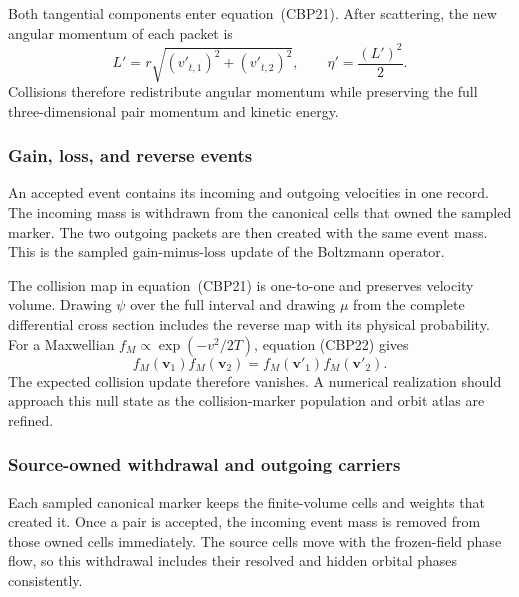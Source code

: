 Both tangential components enter equation~(CBP21).  After scattering, the
new angular momentum of each packet is
\[
 L'=r\sqrt{(v'_{t,1})^2+(v'_{t,2})^2},\qquad
 \eta'=\frac{(L')^2}{2}.                                \tag{CBP23}
\]
Collisions therefore redistribute angular momentum while preserving the full
three-dimensional pair momentum and kinetic energy.

\subsubsection{Gain, loss, and reverse events}

An accepted event contains its incoming and outgoing velocities in one
record.  The incoming mass is withdrawn from the canonical cells that owned
the sampled marker.  The two outgoing packets are then created with the same
event mass.  This is the sampled gain-minus-loss update of the Boltzmann
operator.

The collision map in equation~(CBP21) is one-to-one and preserves velocity
volume.  Drawing \(\psi\) over the full interval and drawing \(\mu\) from the
complete differential cross section includes the reverse map with its
physical probability.  For a Maxwellian \(f_M\propto\exp(-v^2/2T)\), equation
(CBP22) gives
\[
 f_M(\boldsymbol v_1)f_M(\boldsymbol v_2)
 =f_M(\boldsymbol v'_1)f_M(\boldsymbol v'_2).            \tag{CBP24}
\]
The expected collision update therefore vanishes.  A numerical realization
should approach this null state as the collision-marker population and orbit
atlas are refined.

\subsubsection{Source-owned withdrawal and outgoing carriers}

Each sampled canonical marker keeps the finite-volume cells and weights that
created it.  Once a pair is accepted, the incoming event mass is removed from
those owned cells immediately.  The source cells move with the frozen-field
phase flow, so this withdrawal includes their resolved and hidden orbital
phases consistently.

